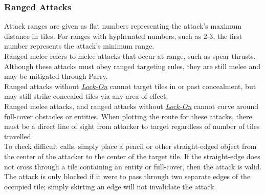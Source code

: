 \documentclass[12pt]{article}
\newcommand{\reftoit}[1]{\hyperlink{#1}{\emph{#1}}}
\begin{document}
\begin{multicols*}{2}
\subsubsection{Ranged Attacks}
Attack ranges are given as flat numbers representing the attack’s maximum distance in tiles. For ranges with hyphenated numbers, such as 2-3, the first number represents the attack’s minimum range.\\
Ranged melee refers to melee attacks that occur at range, such as spear thrusts. Although these attacks must obey ranged targeting rules, they are still melee and may be mitigated through Parry.\\
Ranged attacks without \reftoit{Lock-On} cannot target tiles in or past concealment, but may still strike concealed tiles via any area of effect.\\
Ranged melee attacks, and ranged attacks without \reftoit{Lock-On} cannot curve around full-cover obstacles or entities. When plotting the route for these attacks, there must be a direct line of sight from attacker to target regardless of number of tiles travelled.\\
To check difficult calls, simply place a pencil or other straight-edged object from the center of the attacker to the center of the target tile. If the straight-edge does not cross through a tile containing an entity or full-cover, then the attack is valid. The attack is only blocked if it were to pass through two separate edges of the occupied tile; simply skirting an edge will not invalidate the attack.

\columnbreak


\end{multicols*}
\end{document}
